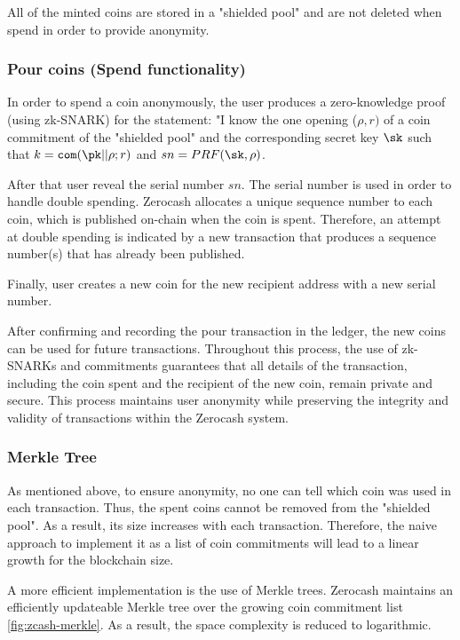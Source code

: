 All of the minted coins are stored in a "shielded pool" and are not deleted when spend in order to provide anonymity.

\subsubsection{Pour coins (Spend functionality)}

In order to spend a coin anonymously, the user produces a zero-knowledge proof (using zk-SNARK) for the statement:
"I know the one opening ($\rho, r)$ of a coin commitment of the "shielded pool" and the corresponding secret key $\sk$ such that $k = \com(\pk||\rho ; r)$ and $sn = PRF(\sk, \rho)$.

After that user reveal the serial number $sn$. The serial number is used in order to handle double spending. Zerocash allocates a unique sequence number to each coin, which is published on-chain when the coin is spent. Therefore, an attempt at double spending is indicated by a new transaction that produces a sequence number(s) that has already been published.

Finally, user creates a new coin for the new recipient address with a new serial number.

After confirming and recording the pour transaction in the ledger, the new coins can be used for future transactions. Throughout this process, the use of zk-SNARKs and commitments guarantees that all details of the transaction, including the coin spent and the recipient of the new coin, remain private and secure. This process maintains user anonymity while preserving the integrity and validity of transactions within the Zerocash system.

\subsubsection{Merkle Tree}
As mentioned above, to ensure anonymity, no one can tell which coin was used in each transaction. 
Thus, the spent coins cannot be removed from the "shielded pool". As a result, its size increases with each transaction. Therefore, the naive approach to implement it as a list of coin commitments will lead to a linear growth for the blockchain size. 

A more efficient implementation is the use of Merkle trees. 
Zerocash maintains an efficiently updateable Merkle tree over the growing coin commitment list \autoref{fig:zcash-merkle}. As a result, the space complexity is reduced to logarithmic.

